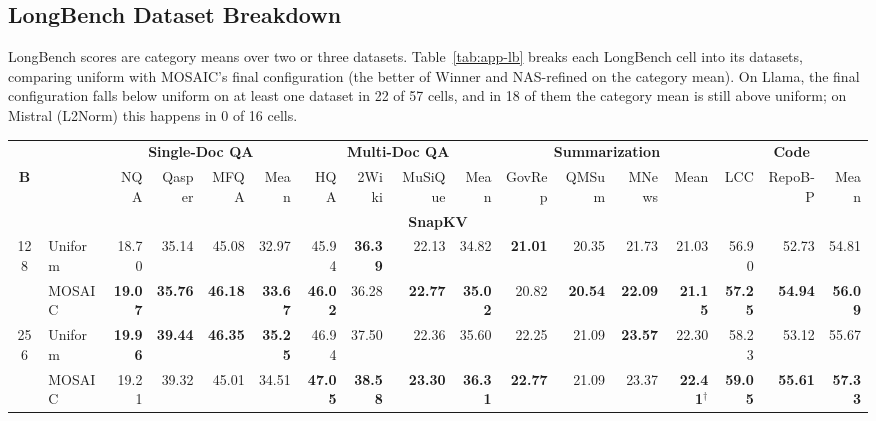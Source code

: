 \subsection{LongBench Dataset Breakdown}
\label{app:dataset-reg}

LongBench scores are category means over two or three datasets. Table~\ref{tab:app-lb} breaks each LongBench cell into its datasets, comparing uniform with MOSAIC's final configuration (the better of Winner and NAS-refined on the category mean). On Llama, the final configuration falls below uniform on at least one dataset in 22 of 57 cells, and in 18 of them the category mean is still above uniform; on Mistral (L2Norm) this happens in 0 of 16 cells.

\begin{table}[tp]
  \centering
  \scriptsize
  \setlength{\tabcolsep}{3pt}
  \renewcommand{\arraystretch}{0.92}
  \begin{tabular}{@{} c l rrrr rrrr rrrr rrr @{}}
    \toprule
    & & \multicolumn{4}{c}{\textbf{Single-Doc QA}} & \multicolumn{4}{c}{\textbf{Multi-Doc QA}} & \multicolumn{4}{c}{\textbf{Summarization}} & \multicolumn{3}{c}{\textbf{Code}} \\
    \cmidrule(lr){3-6} \cmidrule(lr){7-10} \cmidrule(lr){11-14} \cmidrule(lr){15-17}
    \textbf{B} & & NQA & Qasper & MFQA & Mean & HQA & 2Wiki & MuSiQue & Mean & GovRep & QMSum & MNews & Mean & LCC & RepoB-P & Mean \\
    \midrule
    \multicolumn{17}{c}{\textbf{SnapKV}} \\
    \midrule
    \multirow{2}{*}{128} & Uniform & 18.70 & 35.14 & 45.08 & 32.97 & 45.94 & \textbf{36.39} & 22.13 & 34.82 & \textbf{21.01} & 20.35 & 21.73 & 21.03 & 56.90 & 52.73 & 54.81 \\
     & MOSAIC & \textbf{19.07} & \textbf{35.76} & \textbf{46.18} & \textbf{33.67} & \textbf{46.02} & 36.28 & \textbf{22.77} & \textbf{35.02} & 20.82 & \textbf{20.54} & \textbf{22.09} & \textbf{21.15} & \textbf{57.25} & \textbf{54.94} & \textbf{56.09} \\
    \cmidrule(l){1-17}
    \multirow{2}{*}{256} & Uniform & \textbf{19.96} & \textbf{39.44} & \textbf{46.35} & \textbf{35.25} & 46.94 & 37.50 & 22.36 & 35.60 & 22.25 & 21.09 & \textbf{23.57} & 22.30 & 58.23 & 53.12 & 55.67 \\
     & MOSAIC & 19.21 & 39.32 & 45.01 & 34.51 & \textbf{47.05} & \textbf{38.58} & \textbf{23.30} & \textbf{36.31} & \textbf{22.77} & 21.09 & 23.37 & \textbf{22.41}$^\dagger$ & \textbf{59.05} & \textbf{55.61} & \textbf{57.33} \\

\end{tabular}
\end{table}

